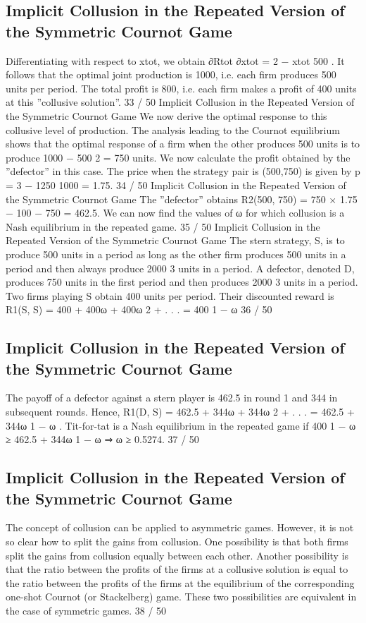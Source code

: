\documentclass[]{report}
\begin{document}
\subsection{Implicit Collusion in the Repeated Version of the Symmetric Cournot Game}
Differentiating with respect to xtot, we obtain
∂Rtot
∂xtot
= 2 −
xtot
500
.
It follows that the optimal joint production is 1000, i.e. each firm
produces 500 units per period.
The total profit is 800, i.e. each firm makes a profit of 400 units at
this ”collusive solution”.
33 / 50
Implicit Collusion in the Repeated Version of the
Symmetric Cournot Game
We now derive the optimal response to this collusive level of
production.
The analysis leading to the Cournot equilibrium shows that the
optimal response of a firm when the other produces 500 units is to
produce 1000 −
500
2 = 750 units.
We now calculate the profit obtained by the ”defector” in this case.
The price when the strategy pair is (500,750) is given by
p = 3 −
1250
1000 = 1.75.
34 / 50
Implicit Collusion in the Repeated Version of the
Symmetric Cournot Game
The ”defector” obtains
R2(500, 750) = 750 × 1.75 − 100 − 750 = 462.5.
We can now find the values of ω for which collusion is a Nash
equilibrium in the repeated game.
35 / 50
Implicit Collusion in the Repeated Version of the
Symmetric Cournot Game
The stern strategy, S, is to produce 500 units in a period as long
as the other firm produces 500 units in a period and then always
produce 2000
3
units in a period.
A defector, denoted D, produces 750 units in the first period and
then produces 2000
3
units in a period.
Two firms playing S obtain 400 units per period. Their discounted
reward is
R1(S, S) = 400 + 400ω + 400ω
2 + . . . =
400
1 − ω
36 / 50
\subsection{Implicit Collusion in the Repeated Version of the Symmetric Cournot Game}
The payoff of a defector against a stern player is 462.5 in round 1
and 344 in subsequent rounds. Hence,
R1(D, S) = 462.5 + 344ω + 344ω
2 + . . . = 462.5 +
344ω
1 − ω
.
Tit-for-tat is a Nash equilibrium in the repeated game if
400
1 − ω
≥ 462.5 +
344ω
1 − ω
⇒ ω ≥ 0.5274.
37 / 50
\subsection{Implicit Collusion in the Repeated Version of the Symmetric Cournot Game}
The concept of collusion can be applied to asymmetric games.
However, it is not so clear how to split the gains from collusion.
One possibility is that both firms split the gains from collusion
equally between each other.
Another possibility is that the ratio between the profits of the firms
at a collusive solution is equal to the ratio between the profits of
the firms at the equilibrium of the corresponding one-shot Cournot
(or Stackelberg) game.
These two possibilities are equivalent in the case of symmetric
games.
38 / 50
\end{document}
